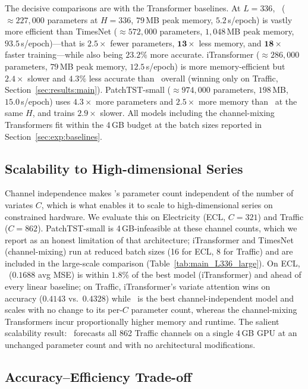 The decisive comparisons are with the Transformer baselines. At $L{=}336$,
\method\ ($\approx227{,}000$ parameters at $H{=}336$, $79$\,MB peak memory,
$5.2$\,s/epoch) is vastly more efficient than TimesNet ($\approx572{,}000$
parameters, $1{,}048$\,MB peak memory, $93.5$\,s/epoch)---that is $\mathbf{2.5\times}$
fewer parameters, $\mathbf{13\times}$ less memory, and $\mathbf{18\times}$ faster
training---while also being $23.2\%$ more accurate. iTransformer
($\approx286{,}000$ parameters, $79$\,MB peak memory, $12.5$\,s/epoch) is more
memory-efficient but $2.4\times$ slower and $4.3\%$ less accurate than \method\
overall (winning only on Traffic, Section~\ref{sec:results:main}).
PatchTST-small ($\approx974{,}000$ parameters, $198$\,MB, $15.0$\,s/epoch) uses
$4.3\times$ more parameters and $2.5\times$ more memory than \method\ at the same
$H$, and trains $2.9\times$ slower. All models including the channel-mixing
Transformers fit within the 4\,GB budget at the batch sizes reported in
Section~\ref{sec:exp:baselines}.

\subsection{Scalability to High-dimensional Series}
\label{sec:eff:ecl}

Channel independence makes \method's parameter count independent of the number of
variates $C$, which is what enables it to scale to high-dimensional series on
constrained hardware. We evaluate this on Electricity (ECL, $C{=}321$) and
Traffic ($C{=}862$). PatchTST-small is 4\,GB-infeasible at these channel counts,
which we report as an honest limitation of that architecture; iTransformer and
TimesNet (channel-mixing) run at reduced batch sizes (16 for ECL, 8 for Traffic)
and are included in the large-scale comparison
(Table~\ref{tab:main_L336_large}). On ECL, \method\ ($0.1688$ avg MSE) is
within $1.8\%$ of the best model (iTransformer) and ahead of every linear
baseline; on Traffic, iTransformer's variate attention wins on accuracy
($0.4143$ vs.\ $0.4328$) while \method\ is the best channel-independent model
and scales with no change to its per-$C$ parameter count, whereas the
channel-mixing Transformers incur proportionally higher memory and runtime.
The salient scalability result: \method\ forecasts all 862 Traffic channels on a
single 4\,GB GPU at an unchanged parameter count and with no architectural
modifications.


\subsection{Accuracy--Efficiency Trade-off}
\label{sec:eff:tradeoff}

